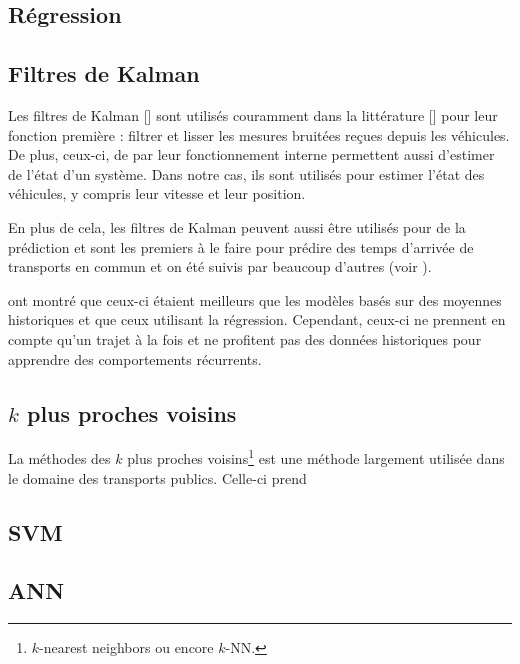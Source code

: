 \documentclass[letterpaper]{article}
\begin{document}
\subsection{Régression}





\subsection{Filtres de Kalman}

Les filtres de Kalman [\cite{kalman1960new}] sont utilisés couramment dans la littérature [\cite{wall1999algorithm, cathey2003prescription, shalaby2004prediction}] pour leur fonction première : filtrer et lisser les mesures bruitées reçues depuis les véhicules. De plus, ceux-ci, de par leur fonctionnement interne permettent aussi d'estimer de l'état d'un système.
Dans notre cas, ils sont utilisés pour estimer l'état des véhicules, y compris leur vitesse et leur position.

En plus de cela, les filtres de Kalman peuvent aussi être utilisés pour de la prédiction et \cite{cathey2003prescription} sont les premiers à le faire pour prédire des temps d'arrivée de transports en commun et on été suivis par beaucoup d'autres (voir \cite{yang2005travel, Altinkaya2013}).

\cite{cathey2003prescription} ont montré que ceux-ci étaient meilleurs que les modèles basés sur des moyennes historiques et que ceux utilisant la régression. Cependant, ceux-ci ne prennent en compte qu'un trajet à la fois et ne profitent pas des données historiques pour apprendre des comportements récurrents.

\subsection{$k$ plus proches voisins}

La méthodes des $k$ plus proches voisins\footnote{$k$-nearest neighbors ou encore $k$-NN.} est une méthode largement utilisée dans le domaine des transports publics. Celle-ci prend
\subsection{SVM}

\subsection{ANN}
\end{document}
